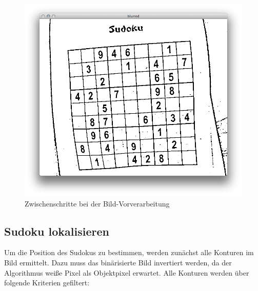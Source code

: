 \begin{figure}[H]
    \begin{center}
        \includegraphics[width=.5\textwidth]{Abbildungen/median}
    \end{center}
    \hfill
    \caption{Zwischenschritte bei der Bild-Vorverarbeitung}
\end{figure}


\subsection{Sudoku lokalisieren}
Um die Position des Sudokus zu bestimmen, werden zunächst alle Konturen im Bild ermittelt.
Dazu muss das binärisierte Bild invertiert werden, da der Algorithmus weiße Pixel als Objektpixel erwartet.
Alle Konturen werden über folgende Kriterien gefiltert:

